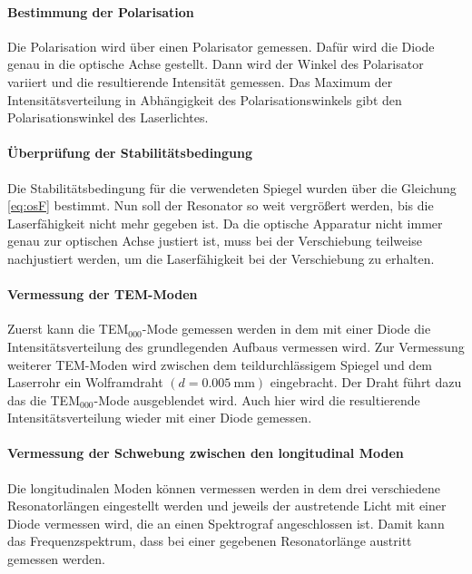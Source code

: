 \paragraph{Bestimmung der Polarisation}
Die Polarisation wird über einen Polarisator gemessen. Dafür wird die Diode genau in die optische Achse 
gestellt. Dann wird der Winkel des Polarisator variiert und die resultierende Intensität gemessen. 
Das Maximum der Intensitätsverteilung in Abhängigkeit des Polarisationswinkels gibt den 
Polarisationswinkel des Laserlichtes. 
\paragraph{Überprüfung der Stabilitätsbedingung}
Die Stabilitätsbedingung für die verwendeten Spiegel wurden über die Gleichung \eqref{eq:osF} bestimmt. 
Nun soll der Resonator so weit vergrößert werden, 
bis die Laserfähigkeit nicht mehr gegeben ist. Da die optische Apparatur nicht immer genau zur optischen 
Achse justiert ist, muss bei der Verschiebung teilweise nachjustiert werden, um die Laserfähigkeit 
bei der Verschiebung zu erhalten.  
\paragraph{Vermessung der TEM-Moden} 
Zuerst kann die TEM$_{000}$-Mode gemessen werden in dem mit einer Diode die Intensitätsverteilung 
des grundlegenden Aufbaus vermessen wird. 
Zur Vermessung weiterer TEM-Moden wird zwischen dem teildurchlässigem Spiegel und dem Laserrohr 
ein Wolframdraht $(d= \SI{0.005}{\milli\meter})$ eingebracht. Der Draht führt dazu das die 
TEM$_{000}$-Mode ausgeblendet wird. Auch hier wird die resultierende Intensitätsverteilung wieder 
mit einer Diode gemessen. 
\paragraph{Vermessung der Schwebung zwischen den longitudinal Moden}
Die longitudinalen Moden können vermessen werden in dem drei verschiedene Resonatorlängen 
eingestellt werden und jeweils der austretende Licht mit einer Diode vermessen wird, die an einen 
Spektrograf angeschlossen ist. Damit kann das Frequenzspektrum, dass bei einer gegebenen Resonatorlänge 
austritt gemessen werden.  


